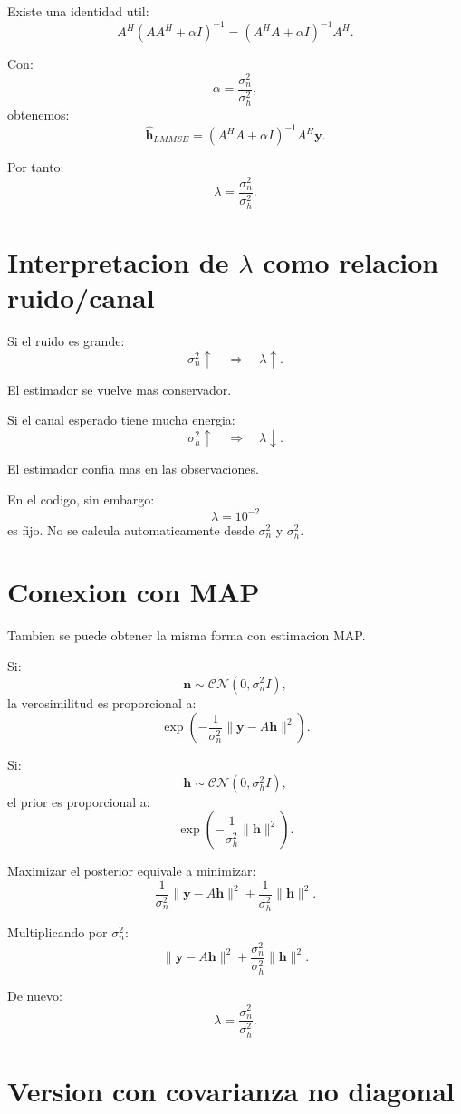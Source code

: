 \documentclass[11pt]{article}
\begin{document}
Existe una identidad util:
\[
    A^H(AA^H+\alpha I)^{-1}
    =
    (A^HA+\alpha I)^{-1}A^H.
\]

Con:
\[
    \alpha = \frac{\sigma_n^2}{\sigma_h^2},
\]
obtenemos:
\[
    \hat{\bm h}_{LMMSE}
    =
    (A^H A+\alpha I)^{-1}A^H\bm y.
\]

Por tanto:
\[
    \lambda = \frac{\sigma_n^2}{\sigma_h^2}.
\]

\section{Interpretacion de \(\lambda\) como relacion ruido/canal}

Si el ruido es grande:
\[
    \sigma_n^2 \uparrow
    \quad \Rightarrow \quad
    \lambda \uparrow.
\]

El estimador se vuelve mas conservador.

Si el canal esperado tiene mucha energia:
\[
    \sigma_h^2 \uparrow
    \quad \Rightarrow \quad
    \lambda \downarrow.
\]

El estimador confia mas en las observaciones.

En el codigo, sin embargo:
\[
    \lambda = 10^{-2}
\]
es fijo. No se calcula automaticamente desde \(\sigma_n^2\) y \(\sigma_h^2\).

\section{Conexion con MAP}

Tambien se puede obtener la misma forma con estimacion MAP.

Si:
\[
    \bm n \sim \mathcal{CN}(0,\sigma_n^2I),
\]
la verosimilitud es proporcional a:
\[
    \exp\left(
        -\frac{1}{\sigma_n^2}
        \|\bm y-A\bm h\|^2
    \right).
\]

Si:
\[
    \bm h \sim \mathcal{CN}(0,\sigma_h^2I),
\]
el prior es proporcional a:
\[
    \exp\left(
        -\frac{1}{\sigma_h^2}
        \|\bm h\|^2
    \right).
\]

Maximizar el posterior equivale a minimizar:
\[
    \frac{1}{\sigma_n^2}\|\bm y-A\bm h\|^2
    +
    \frac{1}{\sigma_h^2}\|\bm h\|^2.
\]

Multiplicando por \(\sigma_n^2\):
\[
    \|\bm y-A\bm h\|^2
    +
    \frac{\sigma_n^2}{\sigma_h^2}
    \|\bm h\|^2.
\]

De nuevo:
\[
    \lambda = \frac{\sigma_n^2}{\sigma_h^2}.
\]

\section{Version con covarianza no diagonal}
\end{document}
